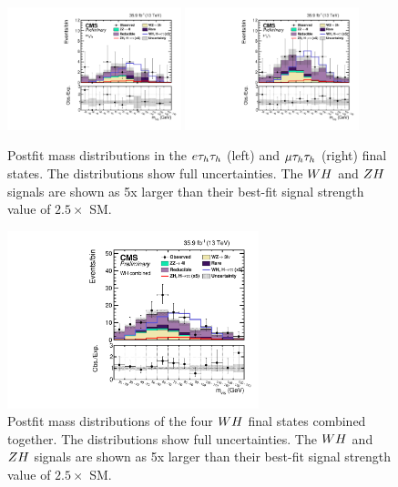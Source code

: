 \begin{figure}[h!]
 \begin{center}
  \includegraphics[width=0.45\textwidth]{higgs_to_taus_vh/plots/wh/ett_postfit.pdf}
  \includegraphics[width=0.45\textwidth]{higgs_to_taus_vh/plots/wh/mtt_postfit.pdf}
 \end{center}
 \caption{Postfit mass distributions in the $e\tau_{h}\tau_{h}$ (left) 
 and $\mu\tau_{h}\tau_{h}$ (right) final states.
 The distributions show full uncertainties.
 The $WH$ and $ZH$ signals are shown as 5x larger than their best-fit
 signal strength value of $2.5 \times$ SM.
 }
 \label{fig:mass_ltt}
\end{figure}

\begin{figure}[h!]
 \begin{center}
  \includegraphics[width=0.65\textwidth]{higgs_to_taus_vh/plots/wh/wh_postfit.pdf}
 \end{center}
 \caption{Postfit mass distributions of the four $WH$ final states
 combined together. 
 The distributions show full uncertainties.
 The $WH$ and $ZH$ signals are shown as 5x larger than their best-fit
 signal strength value of $2.5 \times$ SM.
 }
 \label{fig:mass_wh}
\end{figure}


